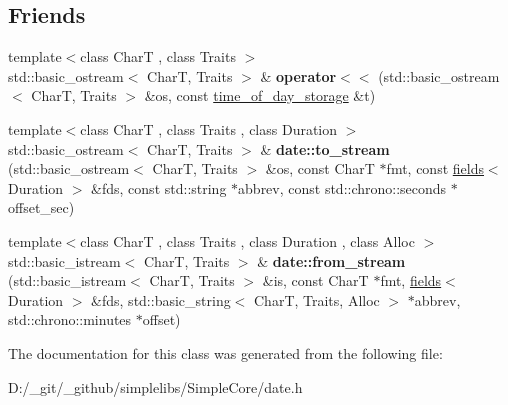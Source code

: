 \subsection*{Friends}
\begin{DoxyCompactItemize}
\item 
\mbox{\label{classdate_1_1detail_1_1time__of__day__storage_3_01std_1_1chrono_1_1duration_3_01_rep_00_01_period1e03169a7045e50b0409508214ed655_aa723ed987ab639045a035ce6020dfb3d}} 
{\footnotesize template$<$class CharT , class Traits $>$ }\\std\+::basic\+\_\+ostream$<$ CharT, Traits $>$ \& {\bfseries operator$<$$<$} (std\+::basic\+\_\+ostream$<$ CharT, Traits $>$ \&os, const \mbox{\hyperlink{classdate_1_1detail_1_1time__of__day__storage}{time\+\_\+of\+\_\+day\+\_\+storage}} \&t)
\item 
\mbox{\label{classdate_1_1detail_1_1time__of__day__storage_3_01std_1_1chrono_1_1duration_3_01_rep_00_01_period1e03169a7045e50b0409508214ed655_af646bb7793065d736d7bc5d5af89c618}} 
{\footnotesize template$<$class CharT , class Traits , class Duration $>$ }\\std\+::basic\+\_\+ostream$<$ CharT, Traits $>$ \& {\bfseries date\+::to\+\_\+stream} (std\+::basic\+\_\+ostream$<$ CharT, Traits $>$ \&os, const CharT $\ast$fmt, const \mbox{\hyperlink{structdate_1_1fields}{fields}}$<$ Duration $>$ \&fds, const std\+::string $\ast$abbrev, const std\+::chrono\+::seconds $\ast$offset\+\_\+sec)
\item 
\mbox{\label{classdate_1_1detail_1_1time__of__day__storage_3_01std_1_1chrono_1_1duration_3_01_rep_00_01_period1e03169a7045e50b0409508214ed655_a0c7fd4eb3b7ef95c2234b7d6c2000f66}} 
{\footnotesize template$<$class CharT , class Traits , class Duration , class Alloc $>$ }\\std\+::basic\+\_\+istream$<$ CharT, Traits $>$ \& {\bfseries date\+::from\+\_\+stream} (std\+::basic\+\_\+istream$<$ CharT, Traits $>$ \&is, const CharT $\ast$fmt, \mbox{\hyperlink{structdate_1_1fields}{fields}}$<$ Duration $>$ \&fds, std\+::basic\+\_\+string$<$ CharT, Traits, Alloc $>$ $\ast$abbrev, std\+::chrono\+::minutes $\ast$offset)
\end{DoxyCompactItemize}


The documentation for this class was generated from the following file\+:\begin{DoxyCompactItemize}
\item 
D\+:/\+\_\+git/\+\_\+github/simplelibs/\+Simple\+Core/date.\+h\end{DoxyCompactItemize}

